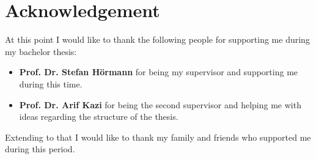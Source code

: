 \chapter*{Acknowledgement}
\label{acknowledgement}
At this point I would like to thank the following people for supporting me during my bachelor thesis:

\begin{itemize}
\item \textbf{Prof. Dr. Stefan Hörmann} for being my supervisor and supporting me during this time.
\item \textbf{Prof. Dr. Arif Kazi} for being the second supervisor and helping me with ideas regarding the structure of the thesis.
\end{itemize}

Extending to that I would like to thank my family and friends who supported me during this period.

